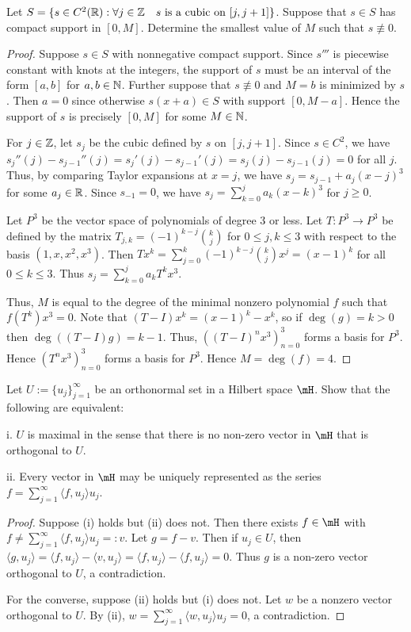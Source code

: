 \documentclass{article}
\begin{document}
 Let $S = \{ s \in C^2(\mathbb{R}) : \forall j \in \mathbb{Z} \quad s \text{ is a cubic on } [j, j+1] \}$.  Suppose that $s \in S$ has compact support in $[0,M]$. Determine the smallest value of $M$ such that $s \not \equiv 0$.

\begin{proof}
Suppose $s \in S$ with nonnegative compact support. Since $s'''$ is piecewise constant with knots at the integers, the support of $s$ must be an interval of the form $[a,b]$ for $a,b \in \mathbb{N}$. Further suppose that $s \not \equiv 0$ and $M = b$ is minimized by $s$. Then $a = 0$ since otherwise $s(x+a) \in S$ with support $[0, M-a]$.  Hence the support of $s$ is precisely $[0,M]$ for some $M \in \mathbb{N}$.

For $j \in \mathbb{Z}$, let $s_j$ be the cubic defined by $s$ on $[j, j+1]$. Since $s \in C^2$, we have $s_{j}''(j) - s_{j-1}''(j) = s_{j}'(j) - s_{j-1}'(j) = s_{j}(j) - s_{j-1}(j) = 0$ for all $j$.  Thus, by comparing Taylor expansions at $x = j$, we have $s_{j} = s_{j-1} + a_j (x-j)^3$ for some $a_{j} \in \mathbb{R}$. Since $s_{-1} = 0$, we have $s_j = \sum_{k=0}^{j} a_k (x - k)^3$ for $j \ge 0$.

Let $P^3$ be the vector space of polynomials of degree $3$ or less. Let $T: P^3 \to P^3$ be defined by the matrix $T_{j,k} = (-1)^{k-j} {k \choose j}$ for $0 \le j,k \le 3$ with respect to the basis $(1, x, x^2, x^3)$. Then $T x^k = \sum_{j=0}^k (-1)^{k-j} {k \choose j} x^j = (x-1)^k$ for all $0 \le k \le 3$. Thus $s_j = \sum_{k=0}^{j} a_k T^k x^3$.

Thus, $M$ is equal to the degree of the minimal nonzero polynomial $f$ such that $f(T^k)x^3  = 0$. Note that $(T - I) x^k = (x - 1)^k - x^k$, so if $\deg(g) = k > 0$ then $\deg((T-I)g) = k - 1$.  Thus, $((T-I)^n x^3)_{n=0}^3$ forms a basis for $P^3$. Hence $(T^n x^3)_{n=0}^3$ forms a basis for $P^3$. Hence $M = \deg(f) = 4$.
\end{proof}

 Let $U := \{u_j\}_{j=1}^\infty$ be an orthonormal set in a Hilbert space $\mH$. Show that the following are equivalent:

i. $U$ is maximal in the sense that there is no non-zero vector in $\mH$ that is orthogonal to $U$.

ii. Every vector in $\mH$ may be uniquely represented as the series $f = \sum_{j=1}^\infty \langle f , u_j \rangle u_j$.

\begin{proof}
Suppose (i) holds but (ii) does not.  Then there exists $f \in \mH$ with $f \neq \sum_{j=1}^\infty \langle f , u_j \rangle u_j =: v$.  Let $g = f - v$.  Then if $u_j \in U$, then $\langle g, u_j \rangle = \langle f, u_j \rangle - \langle v, u_j \rangle = \langle f, u_j \rangle - \langle f, u_j \rangle = 0$. Thus $g$ is a non-zero vector orthogonal to $U$, a contradiction.

For the converse, suppose (ii) holds but (i) does not. Let $w$ be a nonzero vector orthogonal to $U$.  By (ii), $w = \sum_{j=1}^\infty \langle w, u_j \rangle u_j = 0$, a contradiction.
\end{proof}
\end{document}
